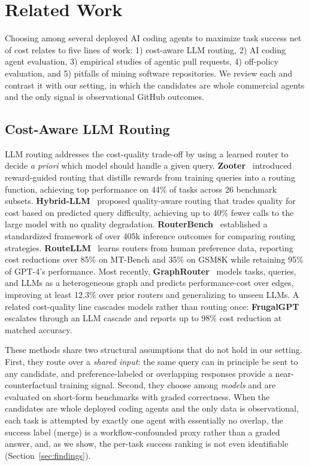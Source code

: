 \section{Related Work}\label{sec:related}
Choosing among several deployed AI coding agents to maximize task success net of cost relates to five lines of work: 1) cost-aware LLM routing, 2) AI coding agent evaluation, 3) empirical studies of agentic pull requests, 4) off-policy evaluation, and 5) pitfalls of mining software repositories. We review each and contrast it with our setting, in which the candidates are whole commercial agents and the only signal is observational GitHub outcomes.

\subsection{Cost-Aware LLM Routing}

LLM routing addresses the cost-quality trade-off by using a learned router to decide \emph{a priori} which model should handle a given query. \textbf{Zooter}~\cite{lu2023routing} introduced reward-guided routing that distills rewards from training queries into a routing function, achieving top performance on 44\% of tasks across 26 benchmark subsets. \textbf{Hybrid-LLM}~\cite{ding2024hybrid} proposed quality-aware routing that trades quality for cost based on predicted query difficulty, achieving up to 40\% fewer calls to the large model with no quality degradation. \textbf{RouterBench}~\cite{hu2024routerbench} established a standardized framework of over 405k inference outcomes for comparing routing strategies. \textbf{RouteLLM}~\cite{ong2024routellm} learns routers from human preference data, reporting cost reductions over 85\% on MT-Bench and 35\% on GSM8K while retaining 95\% of GPT-4's performance. Most recently, \textbf{GraphRouter}~\cite{GraphRouter} models tasks, queries, and LLMs as a heterogeneous graph and predicts performance-cost over edges, improving at least 12.3\% over prior routers and generalizing to unseen LLMs. A related cost-quality line cascades models rather than routing once: \textbf{FrugalGPT}~\cite{chen2024frugalgpt} escalates through an LLM cascade and reports up to 98\% cost reduction at matched accuracy.

These methods share two structural assumptions that do not hold in our setting. First, they route over a \emph{shared input}: the same query can in principle be sent to any candidate, and preference-labeled or overlapping responses provide a near-counterfactual training signal. Second, they choose among \emph{models} and are evaluated on short-form benchmarks with graded correctness. When the candidates are whole deployed coding agents and the only data is observational, each task is attempted by exactly one agent with essentially no overlap, the success label (merge) is a workflow-confounded proxy rather than a graded answer, and, as we show, the per-task success ranking is not even identifiable (Section~\ref{sec:findings}).

